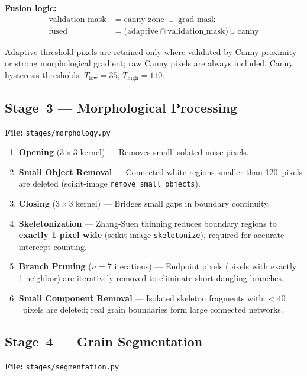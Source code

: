 \documentclass[12pt,a4paper]{article}
\newcommand{\code}[1]{\texttt{#1}}
\newcommand{\file}[1]{\texttt{\small #1}}
\begin{document}
\textbf{Fusion logic:}
\begin{align}
    \text{validation\_mask} &= \text{canny\_zone} \;\cup\; \text{grad\_mask} \\
    \text{fused} &= \bigl(\text{adaptive} \cap \text{validation\_mask}\bigr) \cup \text{canny}
\end{align}

Adaptive threshold pixels are retained only where validated by Canny
proximity or strong morphological gradient; raw Canny pixels are always
included. Canny hysteresis thresholds: $T_\mathrm{low}=35$,
$T_\mathrm{high}=110$.

\subsection{Stage~3 --- Morphological Processing}

\textbf{File:} \file{stages/morphology.py}

\begin{enumerate}[leftmargin=*]
    \item \textbf{Opening} ($3\times3$ kernel) --- Removes small isolated noise pixels.
    \item \textbf{Small Object Removal} --- Connected white regions smaller than
          120~pixels are deleted (scikit-image \code{remove\_small\_objects}).
    \item \textbf{Closing} ($3\times3$ kernel) --- Bridges small gaps in boundary
          continuity.
    \item \textbf{Skeletonization} --- Zhang-Suen thinning reduces boundary
          regions to \textbf{exactly 1 pixel wide} (scikit-image
          \code{skeletonize}), required for accurate intercept counting.
    \item \textbf{Branch Pruning} ($n=7$ iterations) --- Endpoint pixels
          (pixels with exactly 1 neighbor) are iteratively removed to
          eliminate short dangling branches.
    \item \textbf{Small Component Removal} --- Isolated skeleton fragments
          with $<40$~pixels are deleted; real grain boundaries form large
          connected networks.
\end{enumerate}

\subsection{Stage~4 --- Grain Segmentation}

\textbf{File:} \file{stages/segmentation.py}
\end{document}
